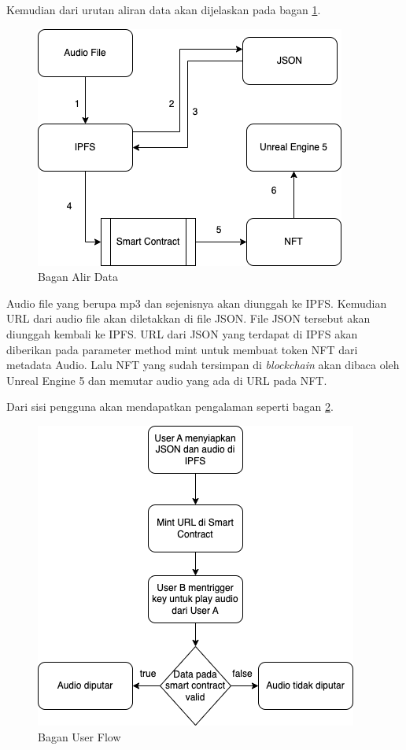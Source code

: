 Kemudian dari urutan aliran data akan dijelaskan pada bagan \ref{fig:alirdata}.
\begin{figure}[H]
  \centering

  \includegraphics[scale=1]{gambar/alir-data.png}

  \caption{Bagan Alir Data}
  \label{fig:alirdata}
\end{figure}

Audio file yang berupa mp3 dan sejenisnya akan diunggah ke IPFS. Kemudian URL dari audio file akan diletakkan di file JSON. File JSON tersebut akan
diunggah kembali ke IPFS. URL dari JSON yang terdapat di IPFS akan diberikan pada parameter method mint untuk membuat token NFT dari metadata Audio.
Lalu NFT yang sudah tersimpan di \emph{blockchain} akan dibaca oleh Unreal Engine 5 dan memutar audio yang ada di URL pada NFT.

Dari sisi pengguna akan mendapatkan pengalaman seperti bagan \ref{fig:userflow}.

\begin{figure}[H]
  \centering

  \includegraphics[scale=1]{gambar/user-flow.png}

  \caption{Bagan User Flow}
  \label{fig:userflow}
\end{figure}

